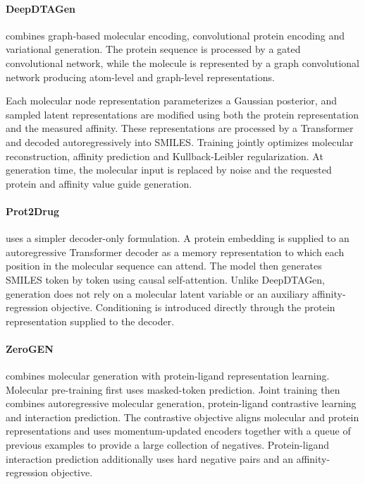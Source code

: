 \documentclass[a4paper,12pt]{article}
\begin{document}
\paragraph{DeepDTAGen
    {\normalfont\parencite{Shah_Zhu_Lu_Wang_Tang_Li_2025}}}
combines graph-based molecular encoding, convolutional protein encoding and
variational generation. The protein sequence is processed by a gated
convolutional network, while the molecule is represented by a graph
convolutional network producing atom-level and graph-level representations.

Each molecular node representation
parameterizes a Gaussian posterior, and sampled latent representations are
modified using both the protein representation and the measured affinity.
These representations are processed by a Transformer and decoded
autoregressively into SMILES. Training jointly optimizes molecular
reconstruction, affinity prediction and Kullback-Leibler regularization. At
generation time, the molecular input is replaced by noise and the requested
protein and affinity value guide generation.

\paragraph{Prot2Drug
    {\normalfont\parencite{Creanza_Alberga_Patruno_Mangiatordi_Ancona_2025}}}
uses a simpler decoder-only formulation. A protein embedding is supplied to an
autoregressive Transformer decoder as a memory representation to which each
position in the molecular sequence can attend. The model then generates SMILES
token by token using causal self-attention. Unlike DeepDTAGen, generation does
not rely on a molecular latent variable or an auxiliary affinity-regression
objective. Conditioning is introduced directly through the protein
representation supplied to the decoder.

\paragraph{ZeroGEN
    {\normalfont\parencite{Chen_Wang_Li_Zeng_Zeng_Xu_2025}}}
combines molecular generation with protein-ligand representation learning.
Molecular pre-training first uses masked-token prediction. Joint training then
combines autoregressive molecular generation, protein-ligand contrastive
learning and interaction prediction. The contrastive objective aligns molecular
and protein representations and uses momentum-updated encoders together with a
queue of previous examples to provide a large collection of negatives.
Protein-ligand interaction prediction additionally uses hard negative pairs and
an affinity-regression objective.
\end{document}

